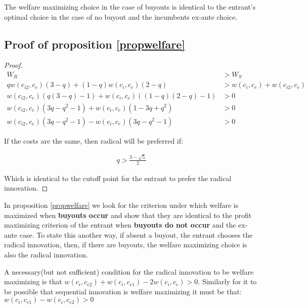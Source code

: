 \begin{proposition}\label{propwelfare}
The welfare maximizing choice in the case of buyouts is identical to the entrant's optimal choice in the case of no buyout and the incumbents ex-ante choice. 
\end{proposition}

\subsection{Proof of proposition \ref{propwelfare}}

\begin{proof} \label{buyoutnobuyout}
\begin{align*}
W_R&> W_S \\
q w(c_{i2}, c_{e})(3-q )
+(1-q)w(c_{i}, c_{e})(2-q) &> w(c_{i}, c_{e}) + w(c_{i2}, c_{e}) \\
 w(c_{i2}, c_{e})(q(3-q) -1)
+w(c_{i}, c_{e})((1-q)(2-q)-1)  &> 0 \\
w(c_{i2}, c_{e})(3q-q^2-1)+w(c_{i}, c_{e})(1-3q+q^2)&>0 \\
 w(c_{i2}, c_{e})(3q-q^2-1)-w(c_{i}, c_{e})(3q-q^2-1) &>0 
\end{align*}

If the costs are the same, then radical will be preferred if:

\begin{align}
q> \frac{3-\sqrt{5}}{2}
\end{align}

Which is identical to the cutoff point for the entrant to prefer the radical innovation. 

\end{proof}

In proposition \ref{propwelfare} we look for the criterion under which welfare is maximized when \textbf{ buyouts occur} and show that they are identical to the profit maximizing criterion of the entrant when \textbf{buyouts do not occur} and the ex-ante case. To state this another way, if absent a buyout, the entrant chooses the radical innovation, then, if there are buyouts, the welfare maximizing choice is also the radical innovation. 

\begin{proposition}
\label{welfare1}
A necessary(but not sufficient) condition for the radical innovation to be welfare maximizing is that $w(c_{i}, c_{e2})+w(c_{i}, c_{e1})-2 w(c_{i}, c_{e}) > 0 $. 
Similarly for it to be possible that sequential innovation is welfare maximizing it must be that: 
$w(c_{i}, c_{e1})-w(c_{i}, c_{e2}) > 0$
\end{proposition}



